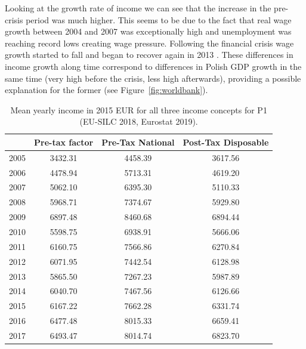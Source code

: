 \documentclass[a4paper]{article}\usepackage[]{graphicx}\usepackage[]{color}
\begin{document}
Looking at the growth rate of income we can see that the increase in the pre-crisis period was much higher. This seems to be due to the fact that real wage growth between 2004 and 2007 was exceptionally high and unemployment was reaching record lows creating wage pressure. Following the financial crisis wage growth started to fall and began to recover again in 2013 \parencite{lewandowski2018labor, gajewski2015labour}. These differences in income growth along time correspond to differences in Polish GDP growth in the same time (very high before the crisis, less high afterwards), providing a possible explanation for the former (see Figure~\ref{fig:worldbank}).
\begin{table}[ht]
\centering
\begin{tabular}{lccc}
  \toprule
 & Pre-tax factor & Pre-Tax National & Post-Tax Disposable \\ 
  \midrule
2005 & 3432.31 & 4458.39 & 3617.56 \\ 
  2006 & 4478.94 & 5713.31 & 4619.20 \\ 
  2007 & 5062.10 & 6395.30 & 5110.33 \\ 
  2008 & 5968.71 & 7374.67 & 5929.80 \\ 
  2009 & 6897.48 & 8460.68 & 6894.44 \\ 
  2010 & 5598.75 & 6938.91 & 5666.06 \\ 
  2011 & 6160.75 & 7566.86 & 6270.84 \\ 
  2012 & 6071.95 & 7442.54 & 6128.98 \\ 
  2013 & 5865.50 & 7267.23 & 5987.89 \\ 
  2014 & 6040.70 & 7467.56 & 6126.66 \\ 
  2015 & 6167.22 & 7662.28 & 6331.74 \\ 
  2016 & 6477.48 & 8015.33 & 6659.41 \\ 
  2017 & 6493.47 & 8014.74 & 6823.70 \\ 
   \bottomrule
\end{tabular}
\caption{Mean yearly income in 2015 EUR for all three income concepts for P1 (EU-SILC 2018, Eurostat 2019).} 
\label{mean_p1}
\end{table}
\end{document}
